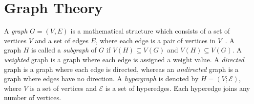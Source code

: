 \documentclass[12pt,a4paper]{report}
\begin{document}
\section{Graph Theory} \label{sec:graph_theory}
A \textit{graph} $G=(V,E)$ is a mathematical structure which consists of a set of vertices $V$ and a set of edges $E$, where each edge is a pair of vertices in $V$~\cite{chartrand}. A graph $H$ is called a \textit{subgraph} of $G$ if $V(H) \subseteq V(G)$ and $V(H) \subseteq V(G)$. A \textit{weighted} graph is a graph where each edge is assigned a weight value. A \textit{directed} graph is a graph where each edge is directed, whereas an \textit{undirected} graph is a graph where edges have no direction. A \textit{hypergraph} is denoted by $H=(V;\mathcal{E})$, where $V$ is a set of vertices and $\mathcal{E}$ is a set of hyperedges. Each hyperedge joins any number of vertices.
\end{document}
